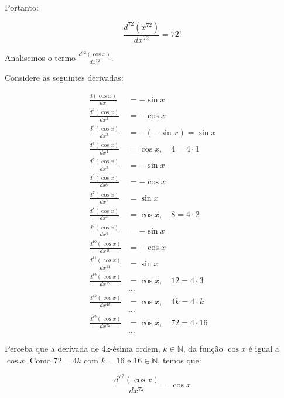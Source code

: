 \documentclass{article}
\begin{document}
Portanto:

\begin{equation}\label{eq:q4_derivada_1}
    \frac{d^{72}(x^{72})}{dx^{72}} = 72!
\end{equation}

Analisemos o termo \( \frac{d^{72}(\cos x )}{dx^{72}}  \).

Considere as seguintes derivadas:

\begin{align*}
    \frac{d(\cos x )}{dx}           & = - \sin x
    \\
    \frac{d^2(\cos x )}{dx^2}       & = - \cos x
    \\
    \frac{d^3(\cos x )}{dx^3}       & = - ( - \sin x) = \sin x
    \\
    \frac{d^4(\cos x )}{dx^4}       & = \cos x, \quad 4 = 4 \cdot 1
    \\
    \frac{d^5(\cos x )}{dx^5}       & = - \sin x
    \\
    \frac{d^6(\cos x )}{dx^6}       & = - \cos x
    \\
    \frac{d^7(\cos x )}{dx^7}       & = \sin x
    \\
    \frac{d^8(\cos x )}{dx^8}       & = \cos x, \quad 8 = 4 \cdot 2
    \\
    \frac{d^9(\cos x )}{dx^9}       & = - \sin x
    \\
    \frac{d^{10}(\cos x )}{dx^{10}} & = - \cos x
    \\
    \frac{d^{11}(\cos x )}{dx^{11}} & = \sin x
    \\
    \frac{d^{12}(\cos x )}{dx^{12}} & = \cos x, \quad 12 = 4 \cdot 3
    \\
                                    & \dots
    \\
    \frac{d^{4k}(\cos x )}{dx^{4k}} & = \cos x, \quad 4k = 4 \cdot k
    \\
                                    & \dots
    \\
    \frac{d^{72}(\cos x )}{dx^{72}} & = \cos x, \quad 72 = 4 \cdot 16
    \\
                                    & \dots
\end{align*}

Perceba que a derivada de 4k-ésima ordem,
\(k \in \mathbb{N} \), da função \( \cos x \) é igual a \( \cos x \).
Como \(72 = 4k\) com \(k = 16\) e \(16 \in \mathbb{N}\), temos que:

\begin{equation}\label{eq:q4_derivada_2}
    \frac{d^{72}(\cos x )}{dx^{72}} = \cos x
\end{equation}
\end{document}

